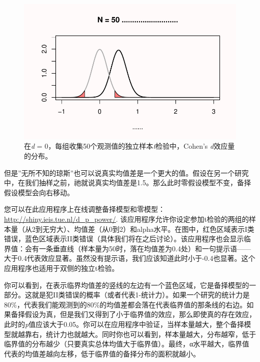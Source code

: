 \documentclass[
  letterpaper,
  DIV=11,
  numbers=noendperiod]{scrreprt}
\begin{document}
\begin{figure}

{\centering \includegraphics[width=1\textwidth,height=\textheight]{01-pvalue_files/figure-pdf/fig-fig134-1.pdf}

}

\caption{\label{fig-fig134}在\emph{d} =
0，每组收集50个观测值的独立样本\emph{t}检验中，Cohen's
\emph{d}效应量的分布。}

\end{figure}

但是''无所不知的琼斯''也可以说真实均值差是一个更大的值。假设在另一个研究中，在我们抽样之前，祂就说真实均值差是1.5。那么此时零假设模型不变，备择假设模型会向右移动。

您可以在此应用程序上在线调整备择模型和零模型：\url{http://shiny.ieis.tue.nl/d_p_power/}.
该应用程序允许你设定参加t检验的两组的样本量（从2到无穷大）、均值差（从0到2）和alpha水平。在图中，红色区域表示I类错误，蓝色区域表示II类错误（具体我们将在之后讨论）。该应用程序也会显示临界值：会有一条垂直线（样本量为50时，落在均值差为0.4处）和一句提示语------大于0.4代表效应显著。虽然没有提示语，我们应该知道此时小于-0.4也显著。这个应用程序也适用于双侧的独立t检验。

你可以看到，在表示临界均值差的竖线的左边有一个蓝色区域，它是备择模型的一部分。这就是犯II类错误的概率（或者代表1-统计力）。如果一个研究的统计力是80\%，代表我们能观测到的80\%的均值差都会落在代表临界值的那条线的右边。如果备择假设为真，但是我们又得到了小于临界值的效应，那么即使真的存在效应，此时的\emph{p}值应该大于0.05。你可以在应用程序中验证，当样本量越大，整个备择模型就越靠右，统计力也就越大。同时你也可以看到，样本量越大，分布越窄，低于临界值的分布越少（只要真实总体均值大于临界值）。最终，α水平越大，临界值代表的均值差越向左移，低于临界值的备择分布的面积就越小。
\end{document}
